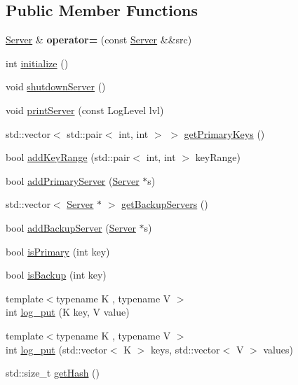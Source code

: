 \subsection*{Public Member Functions}
\begin{DoxyCompactItemize}
\item 
\mbox{\label{classServer_aa1ccd2ac97ce018ebd74b5bca2703e8c}} 
\mbox{\hyperlink{classServer}{Server}} \& {\bfseries operator=} (const \mbox{\hyperlink{classServer}{Server}} \&\&src)
\item 
int \mbox{\hyperlink{classServer_ae94d08657f48a3b51b411463f1137375}{initialize}} ()
\item 
void \mbox{\hyperlink{classServer_a4ce7fd6ac1a1f940db29e57f5f33ae9b}{shutdown\+Server}} ()
\item 
void \mbox{\hyperlink{classServer_a53e470211996f969fdb03f701d3e01fd}{print\+Server}} (const Log\+Level lvl)
\item 
std\+::vector$<$ std\+::pair$<$ int, int $>$ $>$ \mbox{\hyperlink{classServer_ad303d839086eee11137e6fc4a4bb95ab}{get\+Primary\+Keys}} ()
\item 
bool \mbox{\hyperlink{classServer_a395d7cb7194064c961710663926e4a3d}{add\+Key\+Range}} (std\+::pair$<$ int, int $>$ key\+Range)
\item 
bool \mbox{\hyperlink{classServer_a2f865f52beecb3be03eda85b4dc64e3e}{add\+Primary\+Server}} (\mbox{\hyperlink{classServer}{Server}} $\ast$s)
\item 
std\+::vector$<$ \mbox{\hyperlink{classServer}{Server}} $\ast$ $>$ \mbox{\hyperlink{classServer_a71a34c248da1cb74f3453f06223a606e}{get\+Backup\+Servers}} ()
\item 
bool \mbox{\hyperlink{classServer_ab272570a3b1d8eb7f9037c9e7b4e5f2a}{add\+Backup\+Server}} (\mbox{\hyperlink{classServer}{Server}} $\ast$s)
\item 
bool \mbox{\hyperlink{classServer_a9bd7a3b2b12f2f5bddd68eb245111d02}{is\+Primary}} (int key)
\item 
bool \mbox{\hyperlink{classServer_a66708ca0f53116a15258353cc60d1fd4}{is\+Backup}} (int key)
\item 
{\footnotesize template$<$typename K , typename V $>$ }\\int \mbox{\hyperlink{classServer_afb4289a5db1c23ac566dbb085a8f91fb}{log\+\_\+put}} (K key, V value)
\item 
{\footnotesize template$<$typename K , typename V $>$ }\\int \mbox{\hyperlink{classServer_ae419ba1245066b80f42302bb0c86ed00}{log\+\_\+put}} (std\+::vector$<$ K $>$ keys, std\+::vector$<$ V $>$ values)
\item 
std\+::size\+\_\+t \mbox{\hyperlink{classServer_adecf34082977620ca31ca8eab317cf6d}{get\+Hash}} ()
\end{DoxyCompactItemize}
